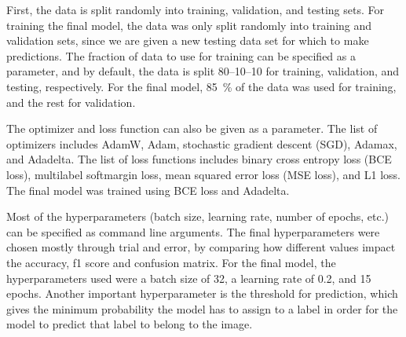 \documentclass[a4paper, 12pt]{article}
\begin{document}


First, the data is split randomly into training, validation, and testing sets. For training the final model, the data was only split randomly into training and validation sets, since we are given a new testing data set for which to make predictions. The fraction of data to use for training can be specified as a parameter, and by default, the data is split 80--10--10 for training, validation, and testing, respectively. For the final model, 85~\% of the data was used for training, and the rest for validation. %

The optimizer and loss function can also be given as a parameter. The list of optimizers includes AdamW, Adam, stochastic gradient descent (SGD), Adamax, and Adadelta. The list of loss functions includes binary cross entropy loss (BCE loss), multilabel softmargin loss, mean squared error loss (MSE loss), and L1 loss. The final model was trained using BCE loss and Adadelta.  %

Most of the hyperparameters (batch size, learning rate, number of epochs, etc.) can be specified as command line arguments. The final hyperparameters were chosen mostly through trial and error, by comparing how different values impact the accuracy, f1 score and confusion matrix. %
For the final model, the hyperparameters used were a batch size of 32, a learning rate of 0.2, and 15 epochs. %
Another important hyperparameter is the threshold for prediction, which gives the minimum probability the model has to assign to a label in order for the model to predict that label to belong to the image.
\end{document}
